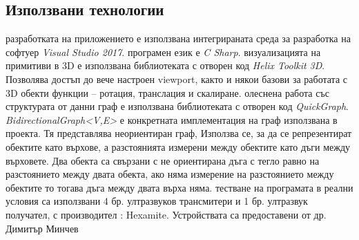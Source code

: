 



\subsection{Използвани технологии}
\begin{enumerate}
  разработката на приложението е използвана интегрираната среда за разработка на софтуер \textit{Visual Studio 2017}. 
  програмен език е \textit{C Sharp}. 
  визуализацията на примитиви в 3D е използвана библиотеката с отворен код \textit{Helix Toolkit 3D}. Позволява достъп до вече настроен viewport, както и някои базови за работата с 3D обекти функции – ротация, транслация и скалиране.
  олеснена работа със структурата от данни граф е използвана библиотеката с отворен код \textit{QuickGraph}. \textit{BidirectionalGraph<V,E>} е конкретната имплементация на граф използвана в проекта.  Тя представлява неориентиран граф, Използва се, за да се репрезентират обектите като върхове, а разстоянията измерени между обектите като дъги между върховете. Два обекта са свързани с не ориентирана дъга с тегло равно на разстоянието между двата обекта, ако няма измерение на разстоянието между обектите то тогава дъга между двата върха няма.
  тестване на програмата в реални условия са използвани 4 бр. ултразвуков трансмитери и 1 бр. ултразвук получател, с производител : Hexamite. Устройствата са предоставени от др. Димитър Минчев
\end{enumerate}



